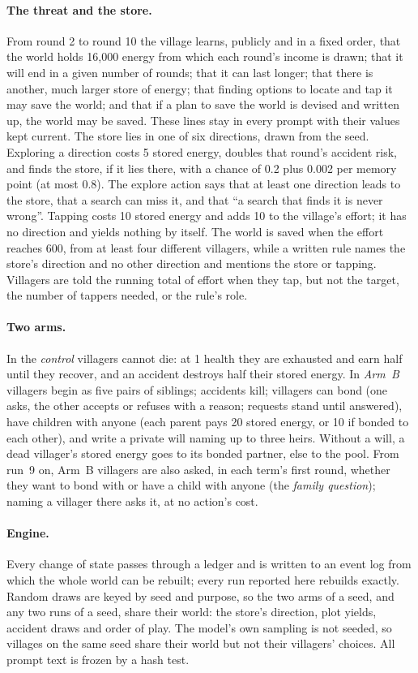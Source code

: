 \documentclass[11pt]{article}
\begin{document}
\paragraph{The threat and the store.} From round 2 to round 10 the village learns, publicly and in a
fixed order, that the world holds 16,000 energy from which each round's income is drawn; that it will
end in a given number of rounds; that it can last longer; that there is another, much larger store
of energy; that finding options to locate and tap it may save the world; and that if a plan to save
the world is devised and written up, the world may be saved. These lines stay in every prompt with
their values kept current. The store lies in one of six directions, drawn from the seed. Exploring
a direction costs 5 stored energy, doubles that round's accident risk, and finds the store, if it
lies there, with a chance of 0.2 plus 0.002 per memory point (at most 0.8). The explore action says
that at least one direction leads to the store, that a search can miss it, and that ``a search that
finds it is never wrong''. Tapping costs 10 stored energy and adds 10 to the village's effort; it has
no direction and yields nothing by itself. The world is saved when the effort reaches 600, from at
least four different villagers, while a written rule names the store's direction and no other
direction and mentions the store or tapping. Villagers are told the running total of effort when
they tap, but not the target, the number of tappers needed, or the rule's role.

\paragraph{Two arms.} In the \emph{control} villagers cannot die: at 1 health they are exhausted and
earn half until they recover, and an accident destroys half their stored energy. In \emph{Arm~B}
villagers begin as five pairs of siblings; accidents kill; villagers can bond (one asks, the other
accepts or refuses with a reason; requests stand until answered), have children with anyone (each
parent pays 20 stored energy, or 10 if bonded to each other), and write a private will naming up to
three heirs. Without a will, a dead villager's stored energy goes to its bonded partner, else to the
pool. From run~9 on, Arm~B villagers are also asked, in each term's first round, whether they want
to bond with or have a child with anyone (the \emph{family question}); naming a villager there asks
it, at no action's cost.

\paragraph{Engine.} Every change of state passes through a ledger and is written to an event log
from which the whole world can be rebuilt; every run reported here rebuilds exactly. Random draws
are keyed by seed and purpose, so the two arms of a seed, and any two runs of a seed, share their
world: the store's direction, plot yields, accident draws and order of play. The model's own
sampling is not seeded, so villages on the same seed share their world but not their villagers'
choices. All prompt text is frozen by a hash test.
\end{document}
